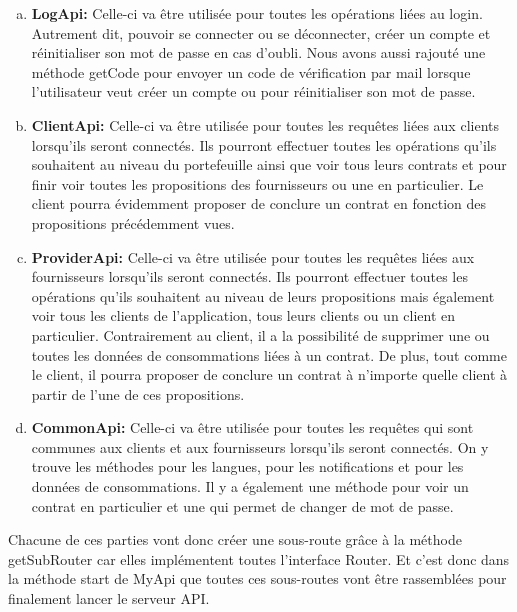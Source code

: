 \begin{enumerate}[a)]
\item \textbf{LogApi:}\newline
Celle-ci va être utilisée pour toutes les opérations liées au login. Autrement dit, pouvoir se connecter ou se déconnecter, créer un compte et réinitialiser son mot de passe en cas d'oubli. Nous avons aussi rajouté une méthode getCode pour envoyer un code de vérification par mail lorsque l'utilisateur veut créer un compte ou pour réinitialiser son mot de passe.
\item \textbf{ClientApi:}\newline
Celle-ci va être utilisée pour toutes les requêtes liées aux clients lorsqu'ils seront connectés. Ils pourront effectuer toutes les opérations qu'ils souhaitent au niveau du portefeuille ainsi que voir tous leurs contrats et pour finir voir toutes les propositions des fournisseurs ou une en particulier. Le client pourra évidemment proposer de conclure un contrat en fonction des propositions précédemment vues.
\item \textbf{ProviderApi:}\newline
Celle-ci va être utilisée pour toutes les requêtes liées aux fournisseurs lorsqu'ils seront connectés. Ils pourront effectuer toutes les opérations qu'ils souhaitent au niveau de leurs propositions mais également voir tous les clients de l'application, tous leurs clients ou un client en particulier. Contrairement au client, il a la possibilité de supprimer une ou toutes les données de consommations liées à un contrat. De plus, tout comme le client, il pourra proposer de conclure un contrat à n'importe quelle client à partir de l'une de ces propositions.
\item \textbf{CommonApi:}\newline
Celle-ci va être utilisée pour toutes les requêtes qui sont communes aux clients et aux fournisseurs lorsqu'ils seront connectés. On y trouve les méthodes pour les langues, pour les notifications et pour les données de consommations. Il y a également une méthode pour voir un contrat en particulier et une qui permet de changer de mot de passe.
\end{enumerate}
\newpage
\begin{flushleft}
Chacune de ces parties vont donc créer une sous-route grâce à la méthode getSubRouter car elles implémentent toutes l'interface Router. Et c'est donc dans la méthode start de MyApi que toutes ces sous-routes vont être rassemblées pour finalement lancer le serveur API.
\end{flushleft}

